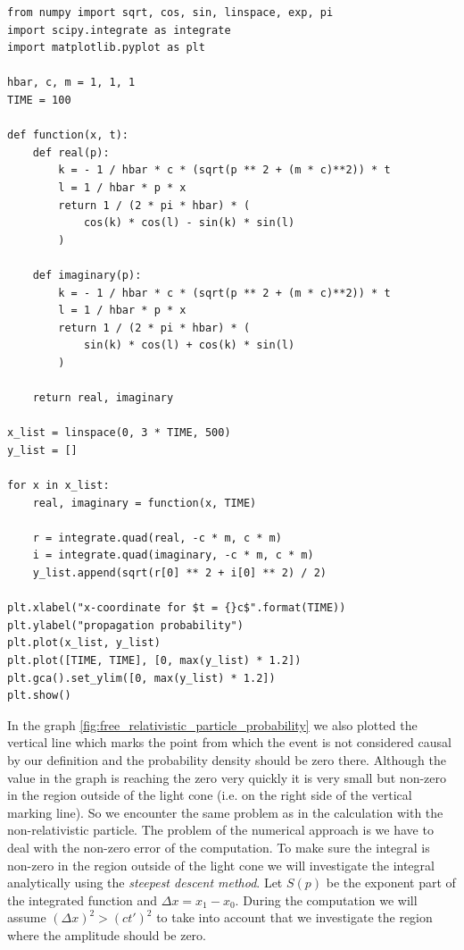 \begin{code}
    \label{code:free_relativistic_particle_amplitude}
    \begin{verbatim}
from numpy import sqrt, cos, sin, linspace, exp, pi
import scipy.integrate as integrate
import matplotlib.pyplot as plt

hbar, c, m = 1, 1, 1
TIME = 100

def function(x, t):
    def real(p):
        k = - 1 / hbar * c * (sqrt(p ** 2 + (m * c)**2)) * t
        l = 1 / hbar * p * x
        return 1 / (2 * pi * hbar) * (
            cos(k) * cos(l) - sin(k) * sin(l)
        )

    def imaginary(p):
        k = - 1 / hbar * c * (sqrt(p ** 2 + (m * c)**2)) * t
        l = 1 / hbar * p * x
        return 1 / (2 * pi * hbar) * (
            sin(k) * cos(l) + cos(k) * sin(l)
        )

    return real, imaginary

x_list = linspace(0, 3 * TIME, 500)
y_list = []

for x in x_list:
    real, imaginary = function(x, TIME)

    r = integrate.quad(real, -c * m, c * m)
    i = integrate.quad(imaginary, -c * m, c * m)
    y_list.append(sqrt(r[0] ** 2 + i[0] ** 2) / 2)

plt.xlabel("x-coordinate for $t = {}c$".format(TIME))
plt.ylabel("propagation probability")
plt.plot(x_list, y_list)
plt.plot([TIME, TIME], [0, max(y_list) * 1.2])
plt.gca().set_ylim([0, max(y_list) * 1.2])
plt.show()
    \end{verbatim}
\end{code}

\clearpage

In the graph \ref{fig:free_relativistic_particle_probability} we also plotted the vertical line which marks the point from which 
the event is not considered causal by our definition and the probability density should be zero there. Although the value
in the graph is reaching the zero very quickly it is very small but non-zero in the region outside of the light cone (i.e. on the 
right side of the vertical marking line). So we encounter the same problem as in the calculation with the non-relativistic
particle. The problem of the numerical approach is we have to deal with the non-zero error of the computation. To make
sure the integral is non-zero in the region outside of the light cone we will investigate the integral analytically using the 
\textit{steepest descent method}. Let $S(p)$ be the exponent part of the integrated function and $\Delta x = x_{1} - x_{0}$. During
the computation we will assume $(\Delta x)^{2} > (ct')^{2}$ to take into account that we investigate the region where the amplitude
should be zero.

